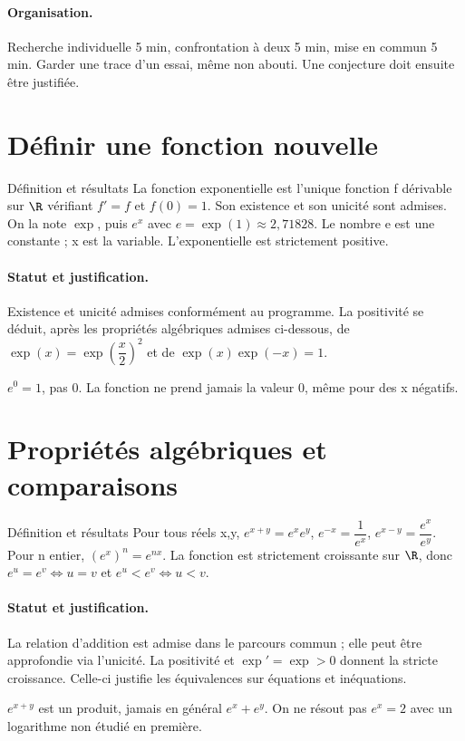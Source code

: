 \paragraph{Organisation.} Recherche individuelle 5 min, confrontation à deux 5 min, mise en commun 5 min. Garder une trace d’un essai, même non abouti. Une conjecture doit ensuite être justifiée.
\section{Définir une fonction nouvelle}\label{C09-U1}
\begin{repere}{Définition et résultats}
La fonction exponentielle est l’unique fonction f dérivable sur $\R$ vérifiant $f\prime=f$ et $f(0)=1$. Son existence et son unicité sont admises. On la note $\exp$, puis $e^x$ avec $e=\exp(1)\approx2{,}71828$. Le nombre e est une constante ; x est la variable. L’exponentielle est strictement positive.
\end{repere}
\paragraph{Statut et justification.} Existence et unicité admises conformément au programme. La positivité se déduit, après les propriétés algébriques admises ci-dessous, de $\exp (x)=\exp (\dfrac{x}{2})^2$ et de $\exp(x)\exp(-x)=1$.
\label{C09-EX1}

\begin{erreur}$e^0=1$, pas 0. La fonction ne prend jamais la valeur 0, même pour des x négatifs.\end{erreur}
\label{C09-AP1}
\section{Propriétés algébriques et comparaisons}\label{C09-U2}
\begin{repere}{Définition et résultats}
Pour tous réels x,y, $e^{x+y}=e^xe^y$, $e^{-x}=\dfrac{1}{e^x}$, $e^{x-y}=\dfrac{e^x}{e^y}$. Pour n entier, $(e^x)^n=e^{nx}$. La fonction est strictement croissante sur $\R$, donc $e^u=e^v\iff u=v$ et $e^u<e^v\iff u<v$.
\end{repere}
\paragraph{Statut et justification.} La relation d’addition est admise dans le parcours commun ; elle peut être approfondie via l’unicité. La positivité et $\exp\prime=\exp>0$ donnent la stricte croissance. Celle-ci justifie les équivalences sur équations et inéquations.
\label{C09-EX2}
\begin{erreur}$e^{x+y}$ est un produit, jamais en général $e^x+e^y$. On ne résout pas $e^x=2$ avec un logarithme non étudié en première.\end{erreur}
\label{C09-AP2}
